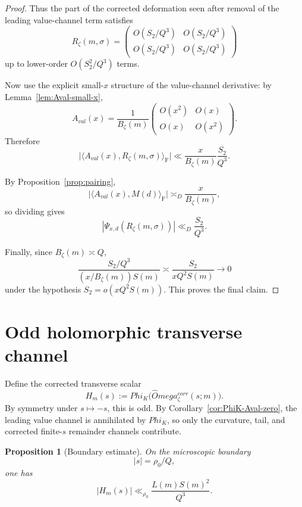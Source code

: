 \documentclass[11pt,a4paper]{amsart}
\def\Omega{Omega}%
\def\Phi{Phi}%
\def\corr{corr}%
\def\val{val}%
\theoremstyle{plain}
\newtheorem{proposition}[theorem]{Proposition}
\theoremstyle{definition}
\newcommand{\val}{\mathrm{val}}
\newcommand{\corr}{\mathrm{corr}}
\newcommand{\F}{\mathrm{F}}
\begin{document}
\begin{proof}
Thus the part of the corrected deformation seen after removal of the leading
value-channel term satisfies
\[
R_\zeta(m,\sigma)
=
\begin{pmatrix}
O(S_2/Q^3) & O(S_2/Q^3)\\
O(S_2/Q^3) & O(S_2/Q^3)
\end{pmatrix}
\]
up to lower-order $O(S_2^2/Q^3)$ terms.

Now use the explicit small-$x$ structure of the value-channel derivative:
by Lemma~\ref{lem:Aval-small-x},
\[
A_{\val}(x)=\frac1{B_\zeta(m)}
\begin{pmatrix}
O(x^2) & O(x)\\
O(x) & O(x^2)
\end{pmatrix}.
\]
Therefore
\[
\bigl|\langle A_{\val}(x),R_\zeta(m,\sigma)\rangle_\F\bigr|
\ll
\frac{x}{B_\zeta(m)}\frac{S_2}{Q^3}.
\]

By Proposition~\ref{prop:pairing},
\[
\bigl|\langle A_{\val}(x),M(d)\rangle_\F\bigr|
\asymp_D
\frac{x}{B_\zeta(m)},
\]
so dividing gives
\[
|\Psi_{x,d}(R_\zeta(m,\sigma))|
\ll_D
\frac{S_2}{Q^3}.
\]

Finally, since $B_\zeta(m)\asymp Q$,
\[
\frac{S_2/Q^3}{(x/B_\zeta(m))S(m)}
\asymp
\frac{S_2}{xQ^2S(m)}\to 0
\]
under the hypothesis $S_2=o(xQ^2S(m))$. This proves the final claim.
\end{proof}

\section{Odd holomorphic transverse channel}

Define the corrected transverse scalar
\begin{equation}\label{eq:Hm-def}
H_m(s):=\Phi_K\!\bigl(\widehat\Omega_\zeta^{\corr}(s;m)\bigr).
\end{equation}
By symmetry under $s\mapsto -s$, this is odd. By
Corollary~\ref{cor:PhiK-Aval-zero}, the leading value channel is
annihilated by $\Phi_K$, so only the curvature, tail, and corrected
finite-$s$ remainder channels contribute.

\begin{proposition}[Boundary estimate]
\label{prop:boundary-estimate}
On the microscopic boundary
\[
|s|=\rho_0/Q,
\]
one has
\[
|H_m(s)|\ll_{\rho_0}\frac{L(m)S(m)^2}{Q^3}.
\]
\end{proposition}
\end{document}
